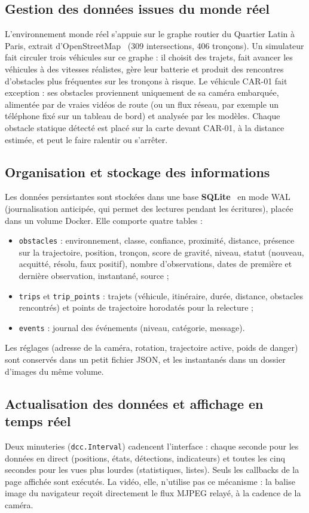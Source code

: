 \subsection{Gestion des données issues du monde réel}
L'environnement monde réel s'appuie sur le graphe routier du Quartier Latin à Paris, extrait d'OpenStreetMap~\cite{osm}
(309 intersections, 406 tronçons). Un simulateur fait circuler trois véhicules sur ce graphe : il choisit des
trajets, fait avancer les véhicules à des vitesses réalistes, gère leur batterie et produit des rencontres
d'obstacles plus fréquentes sur les tronçons à risque. Le véhicule CAR-01 fait exception : ses obstacles proviennent
uniquement de sa caméra embarquée, alimentée par de vraies vidéos de route (ou un flux réseau, par exemple un
téléphone fixé sur un tableau de bord) et analysée par les modèles. Chaque obstacle statique détecté est placé sur
la carte devant CAR-01, à la distance estimée, et peut le faire ralentir ou s'arrêter.

\subsection{Organisation et stockage des informations}
Les données persistantes sont stockées dans une base \textbf{SQLite}~\cite{sqlite} en mode WAL (journalisation
anticipée, qui permet des lectures pendant les écritures), placée dans un volume Docker. Elle comporte quatre tables :
\begin{itemize}
  \item \texttt{obstacles} : environnement, classe, confiance, proximité, distance, présence sur la trajectoire,
        position, tronçon, score de gravité, niveau, statut (nouveau, acquitté, résolu, faux positif), nombre
        d'observations, dates de première et dernière observation, instantané, source ;
  \item \texttt{trips} et \texttt{trip\_points} : trajets (véhicule, itinéraire, durée, distance, obstacles
        rencontrés) et points de trajectoire horodatés pour la relecture ;
  \item \texttt{events} : journal des événements (niveau, catégorie, message).
\end{itemize}
Les réglages (adresse de la caméra, rotation, trajectoire active, poids de danger) sont conservés dans un petit
fichier JSON, et les instantanés dans un dossier d'images du même volume.

\subsection{Actualisation des données et affichage en temps réel}
Deux minuteries (\texttt{dcc.Interval}) cadencent l'interface : chaque seconde pour les données en direct (positions,
états, détections, indicateurs) et toutes les cinq secondes pour les vues plus lourdes (statistiques, listes). Seuls
les callbacks de la page affichée sont exécutés. La vidéo, elle, n'utilise pas ce mécanisme : la balise image du
navigateur reçoit directement le flux MJPEG relayé, à la cadence de la caméra.

